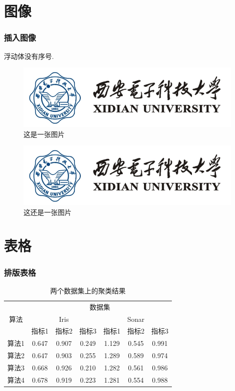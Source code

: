 \documentclass{ctexbeamer}
\begin{document}
\section{图像}
\begin{frame}
    \frametitle{插入图像}
    浮动体没有序号.
    \begin{figure}[htbp!]
        \centering
        \includegraphics[scale=.5]{img/logo_blue.png}
        \caption{这是一张图片}
    \end{figure}
    \begin{figure}[htbp!]
        \centering
        \includegraphics[scale=.5]{img/logo_blue.png}
        \caption{这还是一张图片}
    \end{figure}
\end{frame}
\section{表格}
\begin{frame}
    \frametitle{排版表格}
    \begin{table}
        \centering
        \begin{tabular}{*{7}{c}}
          \toprule
          \multirow{3}{*}{算法} & \multicolumn{6}{c}{数据集} \\
          \cmidrule{2-7}
          & \multicolumn{3}{c}{Iris} & \multicolumn{3}{c}{Sonar} \\
          \cmidrule{2-7}
          & 指标1 & 指标2 & 指标3 & 指标1 & 指标2 & 指标3 \\
          \midrule
          算法1 & 0.647 & 0.907 & 0.249 & 1.129 & 0.545 & 0.991 \\
          算法2 & 0.647 & 0.903 & 0.255 & 1.289 & 0.589 & 0.974 \\
          算法3 & 0.668 & 0.926 & 0.210 & 1.282 & 0.561 & 0.986 \\
          算法4 & 0.678 & 0.919 & 0.223 & 1.281 & 0.554 & 0.988 \\
          \bottomrule
        \end{tabular}
        \caption{两个数据集上的聚类结果}
      \end{table}
\end{frame}
\end{document}
